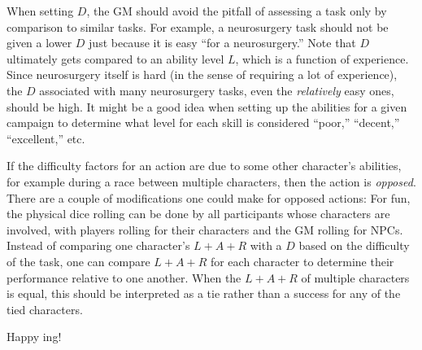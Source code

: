 When setting $D$, the GM should avoid the pitfall of assessing a task only by comparison to similar tasks.
For example, a neurosurgery task should not be given a lower $D$ just because it is easy ``for a neurosurgery.''
Note that $D$ ultimately gets compared to an ability level $L$, which is a function of experience.
Since neurosurgery itself is hard (in the sense of requiring a lot of experience), the $D$ associated with many neurosurgery tasks, even the \emph{relatively} easy ones, should be high.
It might be a good idea when setting up the abilities for a given campaign to determine what level for each skill is considered ``poor,'' ``decent,'' ``excellent,'' etc.

If the difficulty factors for an action are due to some other character's abilities, for example during a race between multiple characters, then the action is \emph{opposed}.
There are a couple of modifications one could make for opposed actions:
For fun, the physical dice rolling can be done by all participants whose characters are involved, with players rolling for their characters and the GM rolling for NPCs.
Instead of comparing one character’s $L + A + R$ with a $D$ based on the difficulty of the task, one can compare $L + A + R$ for each character to determine their performance relative to one another.
When the $L + A + R$ of multiple characters is equal, this should be interpreted as a tie rather than a success for any of the tied characters.

Happy \peupfudge{}ing!

